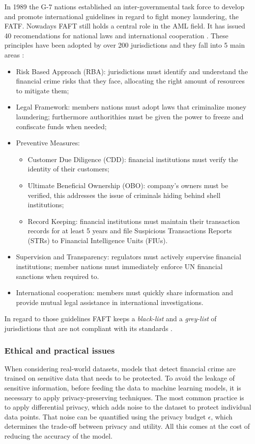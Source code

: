 In 1989 the G-7 nations established an inter-governmental task force to develop and promote international guidelines in regard to fight money laundering, the FATF. Nowadays FAFT still holds a central role in the AML field. It has issued 40 recomendations for national laws and international cooperation \cite{regulations}.
These principles have been adopted by over 200 jurisdictions and they fall into 5 main areas \cite{ruleBased}:
\begin{itemize}
    \item Risk Based Approach (RBA): jurisdictions must identify and understand the financial crime risks that they face, allocating the right amount of resources to mitigate them;
    \item Legal Framework: members nations must adopt laws that criminalize money laundering; furthermore authorithies must be given the power to freeze and confiscate funds when needed;
    \item Preventive Measures:
    \begin{itemize}
        \item Customer Due Diligence (CDD): financial institutions must verify the identity of their customers;
        \item Ultimate Beneficial Ownership (OBO): company's owners must be verified, this addresses the issue of criminals hiding behind shell institutions;
        \item Record Keeping: financial institutions must maintain their transaction records for at least 5 years and file Suspicious Transactions Reports (STRs) to Financial Intelligence Units (FIUs).
    \end{itemize} 
    \item Supervision and Transparency: regulators must actively supervise financial institutions; member nations must immediately enforce UN financial sanctions when required to.
    \item International cooperation: members must quickly share information and provide mutual legal assistance in international investigations.
\end{itemize}
In regard to those guidelines FAFT keeps a \textit{black-list} and a \textit{grey-list} of jurisdictions that are not compliant with its standards \cite{regulations}.

\subsubsection{Ethical and practical issues} \label{patterns}
When considering real-world datasets, models that detect financial crime are trained on sensitive data that needs to be protected. To avoid the leakage of sensitive information, before feeding the data to machine learning models, it is necessary to apply privacy-preserving techniques. The most common practice is to apply differential privacy, which adds noise to the dataset to protect individual data points. That noise can be quantified using the privacy budget $\epsilon$, which determines the trade-off between privacy and utility. All this comes at the cost of reducing the accuracy of the model.

